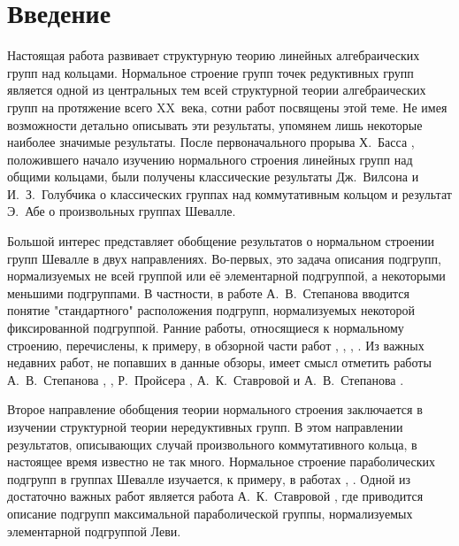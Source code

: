 \documentclass[12pt]{matmex-diploma}
\theoremstyle{mystyleni}
\theoremstyle{mystyle}
\begin{document}
\maketitle
\tableofcontents


\newcommand\placeholder{\textcolor{red}{\textbf{\\\#\\\#\\\#}}}

\newpage
\section{Введение}

Настоящая работа развивает структурную теорию линейных алгебраических групп над кольцами. Нормальное строение групп точек редуктивных групп является одной из центральных тем всей структурной теории алгебраических групп на протяжение всего XX~века, сотни работ посвящены этой теме. Не имея возможности детально описывать эти результаты, упомянем лишь некоторые наиболее значимые результаты. После первоначального прорыва Х.~Басса \citep{Bass1964}, положившего начало изучению нормального строения линейных групп над общими кольцами, были получены классические результаты Дж.~Вилсона \citep{Wilson1972} и И.~З.~Голубчика  \citep{Golubchik1973} о классических группах над коммутативным кольцом и результат Э.~Абе \citep{Abe1989} о произвольных группах Шевалле.

Большой интерес представляет обобщение результатов о нормальном строении групп Шевалле в двух направлениях. Во-первых, это задача описания подгрупп, нормализуемых не всей группой или её элементарной подгруппой, а некоторыми меньшими подгруппами. В частности, в работе А.~В.~Степанова \citep{Stepanov1991} вводится понятие "стандартного" расположения подгрупп, нормализуемых некоторой фиксированной подгруппой.
Ранние работы, относящиеся к нормальному строению, перечислены, к примеру, в обзорной части работ \citep{Bak1999}, \cite{Stepanov1999}, \citep{Vavilov1999}, \citep{Vavilov2009}. Из важных недавних работ, не попавших в данные обзоры, имеет смысл отметить работы А.~В.~Степанова \cite{Stepanov2013}, \citep{Stepanov2016}, Р.~Пройсера \citep{Preusser2018}, А.~К.~Ставровой и А.~В.~Степанова \citep{Stavrova2018}.

Второе направление обобщения теории нормального строения заключается в изучении структурной теории нередуктивных групп. В этом направлении результатов, описывающих случай произвольного коммутативного кольца, в настоящее время известно не так много. Нормальное строение параболических подгрупп в группах Шевалле изучается, к примеру, в работах \citep{Azad1990}, \citep{Roehrle1998}. Одной из достаточно важных работ является работа А.~К.~Ставровой \citep{Stavrova2009}, где приводится описание подгрупп максимальной параболической группы, нормализуемых элементарной подгруппой Леви.
\end{document}
